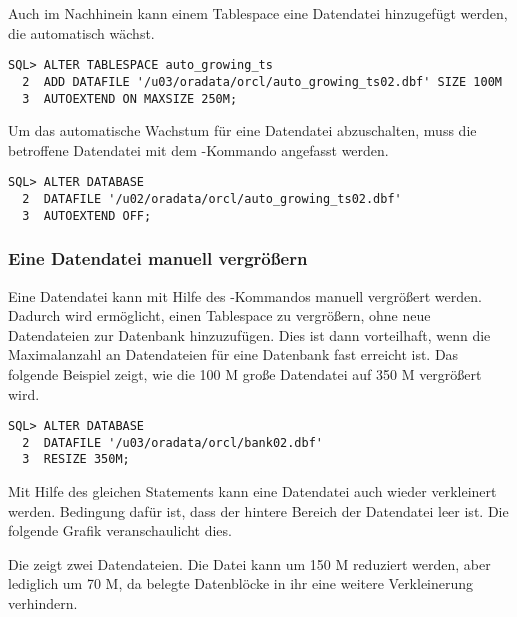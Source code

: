          Auch im Nachhinein kann einem Tablespace eine Datendatei hinzugefügt werden, die automatisch wächst.
          \begin{lstlisting}[caption={Hinzufügen einer Datendatei mit automatischem Wachstum},label=admin124,language=oracle_sql]
SQL> ALTER TABLESPACE auto_growing_ts
  2  ADD DATAFILE '/u03/oradata/orcl/auto_growing_ts02.dbf' SIZE 100M
  3  AUTOEXTEND ON MAXSIZE 250M;
          \end{lstlisting}
          Um das automatische Wachstum für eine Datendatei abzuschalten, muss die betroffene Datendatei mit dem -Kommando angefasst werden.
          \begin{lstlisting}[caption={Automatisches Wachstum für eine Datendatei abschalten},label=admin125,language=oracle_sql]
SQL> ALTER DATABASE
  2  DATAFILE '/u02/oradata/orcl/auto_growing_ts02.dbf'
  3  AUTOEXTEND OFF;
          \end{lstlisting}
        \subsubsection{Eine Datendatei manuell vergrößern}
          Eine Datendatei kann mit Hilfe des -Kommandos manuell vergrößert werden. Dadurch wird ermöglicht, einen Tablespace zu vergrößern, ohne neue Datendateien zur Datenbank hinzuzufügen. Dies ist dann vorteilhaft, wenn die Maximalanzahl an Datendateien für eine Datenbank fast erreicht ist. Das folgende Beispiel zeigt, wie die 100 M große Datendatei  auf 350 M vergrößert wird.
          \begin{lstlisting}[caption={Eine Datendatei manuell vergrößern},label=admin126,language=oracle_sql]
SQL> ALTER DATABASE
  2  DATAFILE '/u03/oradata/orcl/bank02.dbf'
  3  RESIZE 350M;
          \end{lstlisting}
          Mit Hilfe des gleichen Statements kann eine Datendatei auch wieder verkleinert werden. Bedingung dafür ist, dass der hintere Bereich der Datendatei leer ist. Die folgende Grafik veranschaulicht dies.

          Die  zeigt zwei Datendateien. Die Datei  kann um 150 M reduziert werden, aber  lediglich um 70 M, da belegte Datenblöcke in ihr eine weitere Verkleinerung verhindern.
